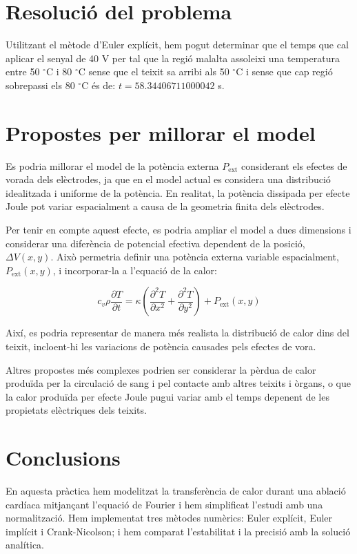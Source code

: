\documentclass[a4paper,11pt,oneside]{article}
\begin{document}
\section{Resolució del problema}

Utilitzant el mètode d'Euler explícit, hem pogut determinar que el temps que cal aplicar el senyal de 40 V per tal que la regió 
malalta assoleixi una temperatura entre 50 $^\circ$C i 80 $^\circ$C sense que el teixit sa arribi als 50 $^\circ$C i sense que 
cap regió sobrepassi els 80 $^\circ$C és de: $t = 58.34406711000042$ s. 

\section{Propostes per millorar el model}

Es podria millorar el model de la potència externa $P_{\mathrm{ext}}$ considerant els efectes de vorada dels elèctrodes, 
ja que en el model actual es considera una distribució idealitzada i uniforme de la potència. En realitat, la potència dissipada 
per efecte Joule pot variar espacialment a causa de la geometria finita dels elèctrodes.

Per tenir en compte aquest efecte, es podria ampliar el model a dues dimensions i considerar una diferència de potencial 
efectiva dependent de la posició, $\Delta V(x,y)$. Això permetria definir una potència externa variable espacialment, 
$P_{\mathrm{ext}}(x,y)$, i incorporar-la a l'equació de la calor:

\[
c_v\rho\frac{\partial T}{\partial t}
= \kappa\left(\frac{\partial^2 T}{\partial x^2} + \frac{\partial^2 T}{\partial y^2}\right) + P_{\mathrm{ext}}(x,y)
\]

Així, es podria representar de manera més realista la distribució de calor dins del teixit, incloent-hi les variacions de 
potència causades pels efectes de vora.

Altres propostes més complexes podrien ser considerar la pèrdua de calor produïda per la circulació de sang i pel contacte amb 
altres teixits i òrgans, o que la calor produïda per efecte Joule pugui variar amb el temps depenent de les propietats elèctriques 
dels teixits.

\section{Conclusions}

En aquesta pràctica hem modelitzat la transferència de calor durant una ablació cardíaca mitjançant l'equació de Fourier i 
hem simplificat l'estudi amb una normalització. Hem implementat tres mètodes numèrics: Euler explícit, Euler implícit i 
Crank-Nicolson; i hem comparat l'estabilitat i la precisió amb la solució analítica.
\end{document}
